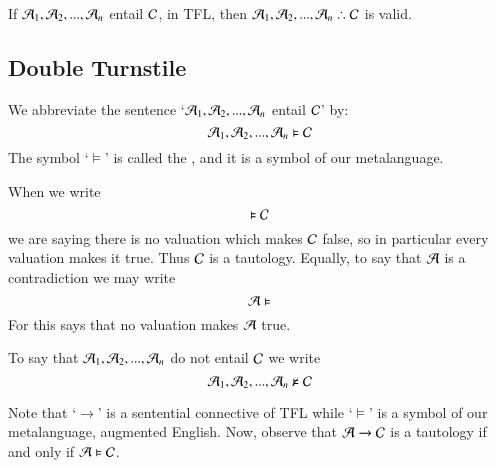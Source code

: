 \documentclass[12pt, a4paper, twoside, openright, titlepage]{book}
\begin{document}
\begin{thm}{}{}
    If $\mathcal{A}_1,\mathcal{A}_2,...,\mathcal{A}_n$ entail $\mathcal{C}$, in TFL, then $\metav{A}_1,\metav{A}_2,...,\metav{A}_n\therefore \metav{C}$ is valid.
\end{thm}

\subsection{\textsection Double Turnstile}

\begin{defn}{}{}
    We abbreviate the sentence `$\mathcal{A}_1,\mathcal{A}_2,...,\mathcal{A}_n$ entail $\mathcal{C}$' by:\begin{equation}
        \mathcal{A}_1,\mathcal{A}_2,...,\mathcal{A}_n\vDash\mathcal{C}
    \end{equation}
    The symbol `$\vDash$' is called the , and it is a symbol of our metalanguage.
\end{defn}

\begin{defn}{}{}
    When we write \begin{equation}
        \vDash\mathcal{C}
    \end{equation}
    we are saying there is no valuation which makes $\mathcal{C}$ false, so in particular every valuation makes it true. Thus $\mathcal{C}$ is a tautology. Equally, to say that $\mathcal{A}$ is a contradiction we may write \begin{equation}
        \mathcal{A}\vDash
    \end{equation}
    For this says that no valuation makes $\mathcal{A}$ true.
\end{defn}


\begin{defn}{}{}
    To say that $\mathcal{A}_1,\mathcal{A}_2,...,\mathcal{A}_n$ do not entail $\mathcal{C}$ we write \begin{equation}
        \mathcal{A}_1,\mathcal{A}_2,...,\mathcal{A}_n \nvDash \mathcal{C}
    \end{equation}
\end{defn}


\begin{rmk}{}{}
    Note that `$\rightarrow$' is a sentential connective of TFL while `$\vDash$' is a symbol of our metalanguage, augmented English. Now, observe that $\mathcal{A} \rightarrow \mathcal{C}$ is a tautology if and only if $\mathcal{A} \vDash \mathcal{C}$.
\end{rmk}
\end{document}
